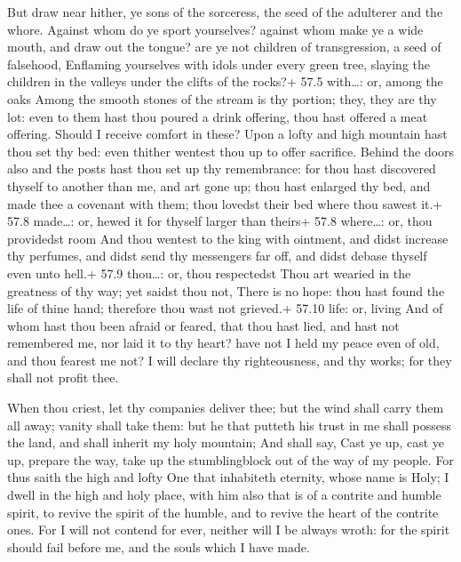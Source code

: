  But draw near hither, ye sons of the sorceress, the seed
of the adulterer and the whore.  Against whom do ye sport
yourselves? against whom make ye a wide mouth, and draw out the tongue?
are ye not children of transgression, a seed of falsehood, 
Enflaming yourselves with idols under every green tree, slaying the
children in the valleys under the clifts of the rocks?+ 57.5 with\ldots:
or, among the oaks  Among the smooth stones of the stream is
thy portion; they, they are thy lot: even to them hast thou poured a
drink offering, thou hast offered a meat offering. Should I receive
comfort in these?  Upon a lofty and high mountain hast thou
set thy bed: even thither wentest thou up to offer sacrifice.
 Behind the doors also and the posts hast thou set up thy
remembrance: for thou hast discovered thyself to another than me, and
art gone up; thou hast enlarged thy bed, and made thee a covenant with
them; thou lovedst their bed where thou sawest it.+ 57.8 made\ldots: or,
hewed it for thyself larger than theirs+ 57.8 where\ldots: or, thou
providedst room  And thou wentest to the king with ointment,
and didst increase thy perfumes, and didst send thy messengers far off,
and didst debase thyself even unto hell.+ 57.9 thou\ldots: or, thou
respectedst  Thou art wearied in the greatness of thy way;
yet saidst thou not, There is no hope: thou hast found the life of thine
hand; therefore thou wast not grieved.+ 57.10 life: or, living
 And of whom hast thou been afraid or feared, that thou
hast lied, and hast not remembered me, nor laid it to thy heart? have
not I held my peace even of old, and thou fearest me not? 
I will declare thy righteousness, and thy works; for they shall not
profit thee.

 When thou criest, let thy companies deliver thee; but
the wind shall carry them all away; vanity shall take them: but he that
putteth his trust in me shall possess the land, and shall inherit my
holy mountain;  And shall say, Cast ye up, cast ye up,
prepare the way, take up the stumblingblock out of the way of my people.
 For thus saith the high and lofty One that inhabiteth
eternity, whose name is Holy; I dwell in the high and holy place, with
him also that is of a contrite and humble spirit, to revive the spirit
of the humble, and to revive the heart of the contrite ones.
 For I will not contend for ever, neither will I be always
wroth: for the spirit should fail before me, and the souls which I have
made.

